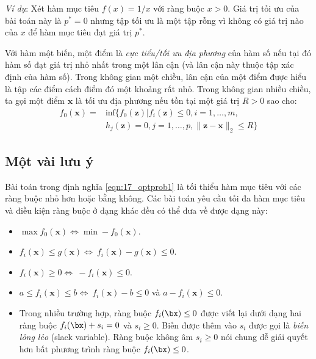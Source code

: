 \textit{Ví dụ}: Xét hàm mục tiêu $f(x) = 1/x$ với ràng buộc $x > 0$. Giá trị tối ưu của bài toán này là $p^* = 0$ nhưng tập tối ưu là một tập rỗng
vì không có giá trị nào của $x$ để hàm mục tiêu đạt giá trị $p^*$. 
 
Với hàm một biến, một điểm là \textit{cực tiểu/tối ưu địa phương} của hàm số nếu tại đó hàm số
đạt giá trị nhỏ nhất trong một lân cận (và lân cận này thuộc tập xác định của
hàm số). Trong không gian một chiều, {lân cận} của một điểm được hiểu là
tập các điểm cách điểm đó một khoảng rất nhỏ. Trong không gian nhiều chiều, ta
gọi một điểm $\mathbf{x}$ là {tối ưu địa phương} nếu tồn tại một
giá trị $R > 0$ sao cho:
\begin{eqnarray} 
    \nonumber
    f_0(\mathbf{x}) = &\text{inf}\big\{f_0(\mathbf{z}) | f_i(\mathbf{z}) \leq 0, i = 1, \dots, m, \\
                 & h_j(\mathbf{z}) = 0, j = 1, \dots, p, \|\mathbf{z} - \mathbf{x}\|_2 \leq R\big\} 
\end{eqnarray} 
 
 
\subsection{Một vài lưu ý}
Bài toán trong định nghĩa \eqref{eqn:17_optprob1} là {tối thiểu hàm mục tiêu} với các ràng buộc nhỏ hơn
hoặc bằng không. Các bài toán yêu cầu {tối đa hàm mục tiêu} và điều kiện
ràng buộc ở dạng khác đều có thể đưa về được dạng này:
\begin{itemize}
    \item $\max f_0(\mathbf{x}) \Leftrightarrow\min -f_0(\mathbf{x}) $. 
     
    \item $f_i(\mathbf{x}) \leq g(\mathbf{x}) \Leftrightarrow\ f_i(\mathbf{x}) - g(\mathbf{x}) \leq 0$. 
     
    \item $f_i(\mathbf{x}) \geq 0 \Leftrightarrow\ -f_i(\mathbf{x}) \leq 0 $. 
     
    \item $a \leq f_i(\mathbf{x}) \leq b \Leftrightarrow\ f_i(\mathbf{x}) -b \leq 0$ và $a - f_i(\mathbf{x}) \leq 0$. 
    \item Trong nhiều trường hợp, ràng buộc $f_i(\bx) \leq 0$ được viết lại dưới dạng hai ràng buộc $f_i(\bx) + s_i = 0$ và $s_i \geq 0$. Biến được thêm vào $s_i$ được gọi là \textit{biến lỏng lẻo} (slack variable).   
    Ràng buộc không âm $s_i \geq 0$ nói chung dễ giải quyết hơn bất phương trình ràng buộc $f_i(\bx) \leq 0$.
\end{itemize}
 
